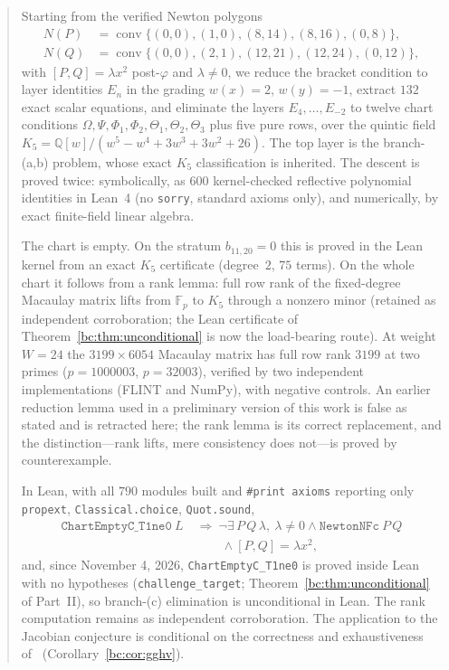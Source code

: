 \documentclass[a4paper,11pt]{article}
\theoremstyle{plain}
\theoremstyle{definition}
\theoremstyle{remark}
\begin{document}
\begin{abstract}
Starting from the verified Newton polygons
\[
\begin{aligned}
N(P)&=\operatorname{conv}\{(0,0),(1,0),(8,14),(8,16),(0,8)\},\\
N(Q)&=\operatorname{conv}\{(0,0),(2,1),(12,21),(12,24),(0,12)\},
\end{aligned}
\]
with $[P,Q]=\lambda x^2$ post-$\varphi$ and $\lambda\ne0$, we reduce the bracket condition to layer identities $E_n$ in the grading $w(x)=2$, $w(y)=-1$, extract $132$ exact scalar equations, and eliminate the layers $E_4,\dots,E_{-2}$ to twelve chart conditions $\Omega,\Psi,\Phi_1,\Phi_2,\Theta_1,\Theta_2,\Theta_3$ plus five pure rows, over the quintic field $K_5=\mathbb{Q}[w]/(w^5-w^4+3w^3+3w^2+26)$. The top layer is the branch-(a,b) problem, whose exact $K_5$ classification is inherited. The descent is proved twice: symbolically, as $600$ kernel-checked reflective polynomial identities in Lean~4 (no \texttt{sorry}, standard axioms only), and numerically, by exact finite-field linear algebra.

The chart is empty. On the stratum $b_{11,20}=0$ this is proved in the Lean kernel from an exact $K_5$ certificate (degree~$2$, $75$ terms). On the whole chart it follows from a rank lemma: full row rank of the fixed-degree Macaulay matrix lifts from $\mathbb{F}_p$ to $K_5$ through a nonzero minor (retained as independent corroboration; the Lean certificate of Theorem~\ref{bc:thm:unconditional} is now the load-bearing route). At weight $W=24$ the $3199\times 6054$ Macaulay matrix has full row rank $3199$ at two primes ($p=1000003$, $p=32003$), verified by two independent implementations (FLINT and NumPy), with negative controls. An earlier reduction lemma used in a preliminary version of this work is false as stated and is retracted here; the rank lemma is its correct replacement, and the distinction---rank lifts, mere consistency does not---is proved by counterexample.

In Lean, with all $790$ modules built and \texttt{\#print axioms} reporting only \texttt{propext}, \texttt{Classical.choice}, \texttt{Quot.sound},
\[
\begin{aligned}
\texttt{ChartEmptyC\_T1ne0}\ L\ &\Rightarrow\
\lnot\exists\,P\,Q\,\lambda,\ \lambda\ne0\land\texttt{NewtonNFc}\ P\,Q \\
&\qquad\land[P,Q]=\lambda x^2,
\end{aligned}
\]
and, since November 4, 2026, \texttt{ChartEmptyC\_T1ne0} is proved inside Lean with no hypotheses (\texttt{challenge\_target}; Theorem~\ref{bc:thm:unconditional} of Part~II), so branch-(c) elimination is unconditional in Lean. The rank computation remains as independent corroboration. The application to the Jacobian conjecture is conditional on the correctness and exhaustiveness of~\cite[Proposition~4.3]{GGHV} (Corollary~\ref{bc:cor:gghv}).


\end{abstract}
\end{document}
